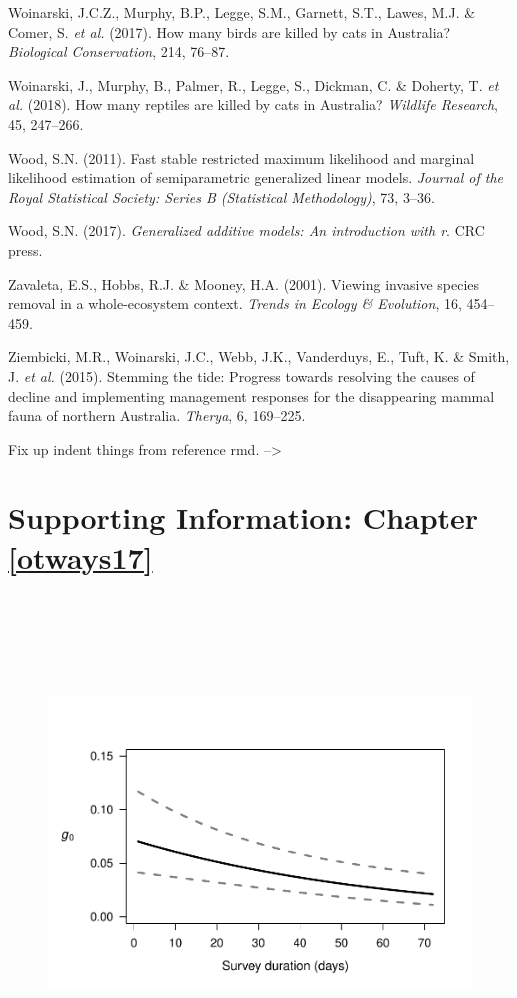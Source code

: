 \documentclass[11pt,a4paper,titlepage,twoside,openright]{style/unimelbthesis}
\begin{document}
\begin{mainmatter}
\leavevmode\hypertarget{ref-woinarski2017birds}{}%
Woinarski, J.C.Z., Murphy, B.P., Legge, S.M., Garnett, S.T., Lawes, M.J. \& Comer, S. \emph{et al.} (2017). How many birds are killed by cats in Australia? \emph{Biological Conservation}, 214, 76--87.

\leavevmode\hypertarget{ref-woinarski2018reptiles}{}%
Woinarski, J., Murphy, B., Palmer, R., Legge, S., Dickman, C. \& Doherty, T. \emph{et al.} (2018). How many reptiles are killed by cats in Australia? \emph{Wildlife Research}, 45, 247--266.

\leavevmode\hypertarget{ref-wood2011fast}{}%
Wood, S.N. (2011). Fast stable restricted maximum likelihood and marginal likelihood estimation of semiparametric generalized linear models. \emph{Journal of the Royal Statistical Society: Series B (Statistical Methodology)}, 73, 3--36.

\leavevmode\hypertarget{ref-wood2017generalized}{}%
Wood, S.N. (2017). \emph{Generalized additive models: An introduction with r}. CRC press.

\leavevmode\hypertarget{ref-zavaleta2001viewing}{}%
Zavaleta, E.S., Hobbs, R.J. \& Mooney, H.A. (2001). Viewing invasive species removal in a whole-ecosystem context. \emph{Trends in Ecology \& Evolution}, 16, 454--459.

\leavevmode\hypertarget{ref-ziembicki2015stemming}{}%
Ziembicki, M.R., Woinarski, J.C., Webb, J.K., Vanderduys, E., Tuft, K. \& Smith, J. \emph{et al.} (2015). Stemming the tide: Progress towards resolving the causes of decline and implementing management responses for the disappearing mammal fauna of northern Australia. \emph{Therya}, 6, 169--225.

\appendix

Fix up indent things from reference rmd.
--\textgreater{}
\setlength{\parindent}{0in}
\setlength{\leftskip}{0in}
\setlength{\parskip}{8pt}

\hypertarget{otways17-app}{%
\chapter{Supporting Information: Chapter \ref{otways17}}\label{otways17-app}}

\newpage

\(~\)

\(~\)

\(~\)
\begin{figure}

{\centering \includegraphics[width=0.7\linewidth]{figure/otways17-g0t-1} 

}
\end{figure}
\end{mainmatter}
\end{document}
